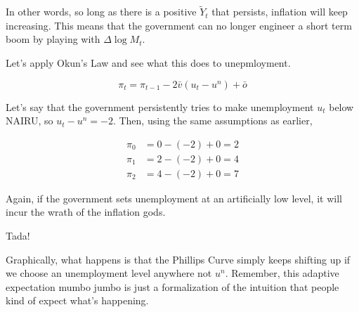 \documentclass[11pt]{scrartcl}
\newcommand{\og}{\ensuremath{\tilde{Y}}}
\begin{document}
In other words, so long as there is a positive $\og_t$ that persists, inflation will keep increasing. This means that the government can no longer engineer a short term boom by playing with $\Delta \log{M_t}$.

Let's apply Okun's Law and see what this does to unepmloyment.

\[ \pi_t = \pi_{t-1} - 2 \bar{v} (u_{t} - u^n) + \bar{o} \] 

Let's say that the government persistently tries to make unemployment $u_t$ below NAIRU, so $u_t - u^n = -2$. Then, using the same assumptions as earlier,

\begin{align*}
\pi_0 &= 0 - (-2) + 0 = 2 \\ 
\pi_1 &= 2 - (-2) + 0 = 4 \\ 
\pi_2 &= 4 - (-2) + 0 = 7
\end{align*}

Again, if the government sets unemployment at an artificially low level, it will incur the wrath of the inflation gods. 

Tada!

Graphically, what happens is that the Phillips Curve simply keeps shifting up if we choose an unemployment level anywhere not $u^n$. Remember, this adaptive expectation mumbo jumbo is just a formalization of the intuition that people kind of expect what's happening.
\end{document}
